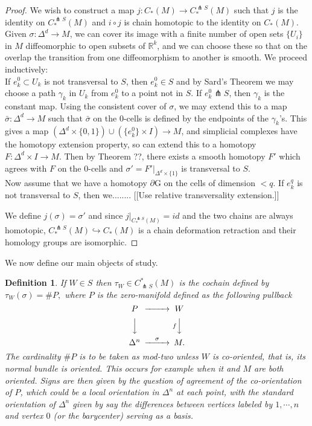 \documentclass{amsart}          %
\newtheorem{definition}[theorem]{Definition}
\newcommand{\R}{\mathbb R}
\begin{document}
\begin{proof} We wish to construct a map $j:C_{*}(M) \rightarrow C^{\pitchfork S}_{*}(M)$ such that $j$ is the identity on $C^{\pitchfork S}_{*}(M)$ and 
$i \circ j$ is chain homotopic to the identity on $C_{*}(M)$. Given $\sigma:\Delta^d \rightarrow M$, we can cover its image with a finite number of 
open sets $\{U_i\}$ in $M$ diffeomorphic to open subsets of $\R^k$, and we can choose these so that on the overlap the transition from one 
diffeomorphism to another is smooth. We proceed inductively: \\If $e^0_k \subset U_k$ is not transversal to $S$, then $e^0_k \in S$ and by 
Sard's Theorem we may choose a path $\gamma_k$ in $U_k$ from $e^0_k$ to a point not in $S$. If $e^0_k \pitchfork S$, then $\gamma_k$ is the 
constant map. Using the consistent cover of $\sigma$, we may extend this to a map $\bar{\sigma}:\Delta^d \rightarrow M$ such that $\bar{\sigma}$ 
on the 0-cells is defined by the endpoints of the $\gamma_k$'s. This gives a map 
$\left(\Delta^d \times \{0,1\} \right)\cup \left(\{e^0_k\} \times I \right)\rightarrow M$, and simplicial complexes have the homotopy extension property, 
so can extend this to a homotopy $F: \Delta^d \times I \rightarrow M$. Then by Theorem ??, there exists a smooth homotopy $F'$ which 
agrees with $F$ on the 0-cells and $\sigma'=\left.F'\right|_{\Delta^d \times \{1\}}$ is transversal to $S$.\\
Now assume that we have a homotopy $\partial$G on the cells of dimension $<q$. If $e^q_k $ is not transversal to $S$, then we........  
[[Use relative transversality
extension.]]


We define $j(\sigma) = \sigma'$ and since $\left.j\right|_{C^{\pitchfork S}_{*}(M)}=id$ and the two chains are always homotopic, $C^{\pitchfork S}_{*}(M) \hookrightarrow C_{*}(M)$ is a chain deformation retraction and their homology groups are isomorphic.
\end{proof}

We now define our main objects of study.
\begin{definition}
If $W \in S$ then $\tau_{W} \in C^{*}_{\pitchfork S}(M)$ is the cochain defined by $\tau_W (\sigma) = \# P,$  where $P$ is
the  zero-manifold defined as the following pullback
$$
\begin{CD}
P @>>> W\\
@VVV  @VfVV\\
\Delta^n @>\sigma>> M.
\end{CD}
$$
The cardinality $\# P$ is to be taken as mod-two unless $W$  is co-oriented, that is, its normal bundle is oriented.  This occurs
for example when it and $M$ are both oriented.  Signs are then given by the question of agreement of the co-orientation of $P$, 
which could be a local orientation in $\Delta^n$ at each point, with the standard orientation of $\Delta^n$ given by say the differences between vertices labeled by $1, \cdots, n$ and vertex $0$ (or the barycenter) serving as a basis.
\end{definition}
\end{document}

